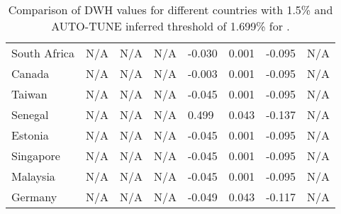 \documentclass[utf8]{FrontiersinHarvard} %
\begin{document}
\begin{table}[h!]
\begin{tabularx}{\textwidth}{|l|X|X|X|X|X|X|X|}
		South Africa     & N/A                  & N/A                            & N/A                            & -0.030                 & 0.001                            & -0.095                           & N/A                     \\
		Canada           & N/A                  & N/A                            & N/A                            & -0.003                 & 0.001                            & -0.095                           & N/A                     \\
		Taiwan           & N/A                  & N/A                            & N/A                            & -0.045                 & 0.001                            & -0.095                           & N/A                     \\
		Senegal          & N/A                  & N/A                            & N/A                            & 0.499                  & 0.043                            & -0.137                           & N/A                     \\
		Estonia          & N/A                  & N/A                            & N/A                            & -0.045                 & 0.001                            & -0.095                           & N/A                     \\
		Singapore        & N/A                  & N/A                            & N/A                            & -0.045                 & 0.001                            & -0.095                           & N/A                     \\
		Malaysia         & N/A                  & N/A                            & N/A                            & -0.045                 & 0.001                            & -0.095                           & N/A                     \\
		Germany          & N/A                  & N/A                            & N/A                            & -0.049                 & 0.043                            & -0.117                           & N/A                     \\
		\hline
	\end{tabularx}
	\caption{Comparison of DWH values for different countries with 1.5\% and AUTO-TUNE inferred threshold of 1.699\% for \cite{rhee_national_2019}.}
	\label{tab:DWH_comparison}
\end{table}
\end{document}
